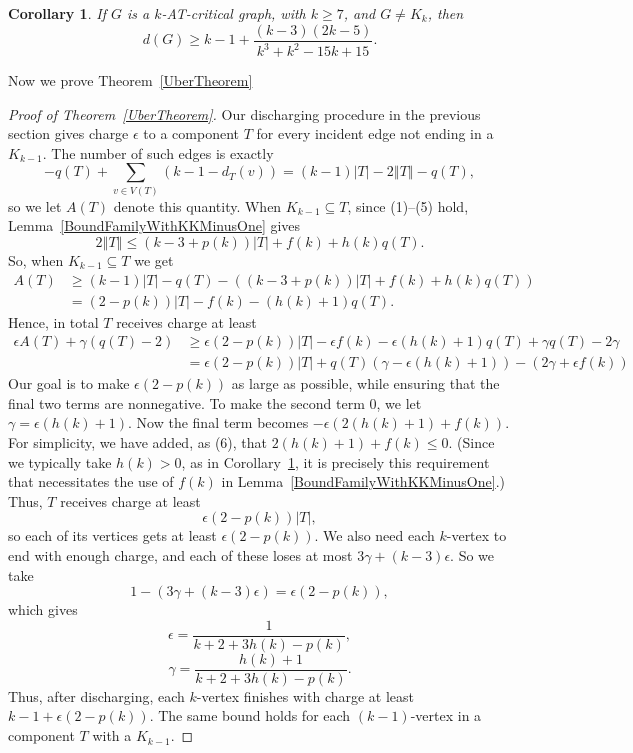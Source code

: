 \documentclass[12pt]{article}
\theoremstyle{plain}
\newtheorem{cor}[thm]{Corollary}
\theoremstyle{definition}
\theoremstyle{remark}
\newcommand{\set}[1]{\left\{ #1 \right\}}
\newcommand{\card}[1]{\left|#1\right|}
\newcommand{\size}[1]{\left\Vert#1\right\Vert}
\newcommand{\parens}[1]{\left( #1 \right)}
\begin{document}
\begin{cor}\label{MainCor}
If $G$ is a $k$-AT-critical graph, with $k\ge 7$, and $G\ne K_k$, then
 \[d(G) \ge k-1 + \frac{(k-3)(2k-5)}{k^3 + k^2 - 15k + 15}.\]
\end{cor}

Now we prove Theorem~\ref{UberTheorem}
\begin{proof}[Proof of Theorem~\ref{UberTheorem}]
Our discharging procedure in the previous section gives charge $\epsilon$ to a component $T$ for every incident edge not ending in a $K_{k-1}$.  The number of such edges is exactly
%
\[-q(T) + \sum_{v \in V(T)} (k-1 - d_T(v)) = (k-1)\card{T} - 2\size{T} - q(T),\]
%
so we let $A(T)$ denote this quantity.  When $K_{k-1} \subseteq T$, since
(1)--(5) hold, Lemma~\ref{BoundFamilyWithKKMinusOne} gives
%
\[2\size{T} \le (k-3 + p(k))\card{T} + f(k) + h(k)q(T).\]
%
So, when $K_{k-1} \subseteq T$ we get
%
\begin{align*}
    A(T) & \ge (k-1)\card{T} - q(T) - ((k-3 + p(k))\card{T} + f(k) + h(k)q(T))\\
         &  =(2-p(k))\card{T} - f(k) - (h(k) + 1)q(T).
\end{align*}
Hence, in total $T$ receives charge at least
\begin{align*}
    \epsilon A(T) + \gamma(q(T) - 2) &\ge \epsilon(2-p(k))|T| - \epsilon f(k) - \epsilon (h(k)+1)q(T) +\gamma q(T)-2\gamma \\
    & = \epsilon(2-p(k))|T| + q(T)(\gamma - \epsilon (h(k)+1)) - (2\gamma + \epsilon f(k))
\end{align*}
%
Our goal is to make $\epsilon(2-p(k))$ as large as possible, while ensuring that the final two terms are nonnegative.  To make the second term 0, we let $\gamma = \epsilon(h(k) + 1)$.  Now the final term becomes $-\epsilon(2(h(k)+1)+f(k))$.
%
%
For simplicity, we have added, as (6), that $2(h(k) + 1) + f(k) \le 0$.  (Since we typically take $h(k) > 0$, as in Corollary~\ref{MainCor}, it is precisely this requirement that necessitates the use of $f(k)$ in Lemma~\ref{BoundFamilyWithKKMinusOne}.)  Thus, $T$ receives charge at least
\[\epsilon\parens{2-p(k)}\card{T},\]
so each of its vertices gets at least $\epsilon(2-p(k))$.
We also need each $k$-vertex to end with enough charge, and each of these loses at most $3\gamma+(k-3)\epsilon$.  So we take
\[1 - (3\gamma + (k-3)\epsilon) = \epsilon\parens{2-p(k)},\]
which gives
\[\epsilon = \frac{1}{k+2 + 3h(k) - p(k)},\]
\[\gamma = \frac{h(k)+1}{k+2 + 3h(k) - p(k)}.\]
Thus, after discharging, each $k$-vertex finishes with charge at least $k-1+\epsilon(2-p(k))$.  The same bound holds for each $(k-1)$-vertex in a component $T$ with a $K_{k-1}$.


\end{proof}
\end{document}

